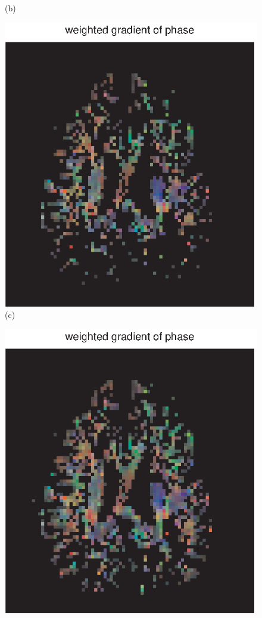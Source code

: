 \documentclass[authoryear,preprint,12pt]{elsarticle}
\begin{document}
\begin{figure}[p]
\begin{center}
\begin{minipage}[]{.42\textwidth}
      (b)
      \end{minipage}
      \begin{minipage}[]{.42\textwidth}
      \centering
       \includegraphics[width=\textwidth]{1gradphase55b.eps}
       (c)
      \end{minipage}
      \begin{minipage}[]{.42\textwidth}
      \centering
      \includegraphics[width=\textwidth]{1gradphase55d.eps}

\end{minipage}
\end{center}
\end{figure}
\end{document}
